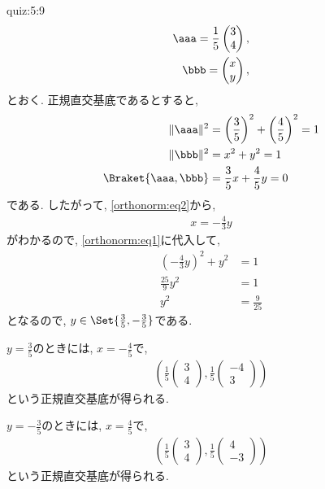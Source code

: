 \begin{answerof}{quiz:5:9}
  \begin{align*}
    \aaa=\frac{1}{5}\begin{pmatrix}3\\4\end{pmatrix},\\
    \bbb=\begin{pmatrix}x\\y\end{pmatrix},
  \end{align*}
  とおく.
  正規直交基底であるとすると,
  \begin{align}
    \|\aaa\|^2&=\left(\frac{3}{5}\right)^2+\left(\frac{4}{5}\right)^2=1\\
    \|\bbb\|^2&=x^2+y^2=1     \label{orthonorm:eq1}\\
    \Braket{\aaa,\bbb}&=\frac{3}{5}x+\frac{4}{5}y=0
    \label{orthonorm:eq2}
  \end{align}
  である. したがって, \cref{orthonorm:eq2}から,
  \begin{align*}
    x=-\frac{4}{3}y
  \end{align*}
  がわかるので, \cref{orthonorm:eq1}に代入して,
  \begin{align*}
    \left(-\frac{4}{3}y\right)^2+y^2&=1\\
    \frac{25}{9}y^2&=1\\
    y^2&=\frac{9}{25}
  \end{align*}
  となるので, $y\in\Set{\frac{3}{5},-\frac{3}{5}}$である.

  $y=\frac{3}{5}$のときには,
  $x=-\frac{4}{5}$で,
  \begin{align*}
    (\frac{1}{5}\begin{pmatrix}3\\4\end{pmatrix},
    \frac{1}{5}\begin{pmatrix}-4\\3\end{pmatrix})
  \end{align*}
  という正規直交基底が得られる.

  $y=-\frac{3}{5}$のときには,
  $x=\frac{4}{5}$で,
  \begin{align*}
    (\frac{1}{5}\begin{pmatrix}3\\4\end{pmatrix},
    \frac{1}{5}\begin{pmatrix}4\\-3\end{pmatrix})
  \end{align*}
  という正規直交基底が得られる.
\end{answerof}

